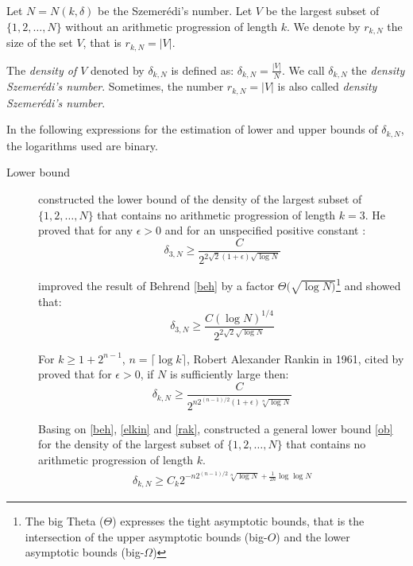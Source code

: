 \begin{defn} Let $N=N(k, \delta)$ be the Szemerédi's number. Let $V$ be the largest subset of $\{1,2,\ldots, N \}$ without an arithmetic progression of length $k.$ We denote by $r_{k,N}$ the size of the set $V$, that is  $r_{k,N}= |V|.$

The \textit{density of $V$} denoted by $\delta_{k,N}$ is defined as: $\delta_{k,N}=\frac{|V|}{N}.$ We call  $\delta_{k,N}$ the \textit{density Szemerédi's number}. Sometimes, the number $r_{k,N}= |V|$ is also called \textit{density Szemerédi's number}.

\end{defn}


In the following expressions for the estimation of lower and upper bounds of $\delta_{k,N}$, the logarithms used are binary.
\begin{description}
\item[Lower bound]
\cite{behrend1946sets} constructed the lower bound of the density of the largest subset of $\{1,2, \ldots, N\}$ that contains no arithmetic progression of length $k=3$. He proved that for any $\epsilon >0$ and for an unspecified positive constant :
\begin{equation}
\delta_{3,N} \geq \frac{C}{2^{2\sqrt{2}(1+\epsilon) \sqrt{\log N}}} \label{beh}
\end{equation}

\cite{elkin2010improved} improved the result of Behrend \eqref{beh} by a factor $\Theta (\sqrt{\log N)}$\footnote{The big Theta ($\Theta$) expresses the tight asymptotic  bounds, that is the intersection of  the upper asymptotic bounds (big-$O$) and the lower asymptotic bounds (big-$\Omega$) } and showed that:
\begin{equation}
\delta_{3,N} \geq \frac{C (\log N)^{1/4}}{2^{2\sqrt{2} \sqrt{\log N}}} \label{elkin}
\end{equation}

For $k \geq 1+2^{n-1}$,  $n=\lceil \log k \rceil$, Robert Alexander Rankin in 1961, cited by \cite{o2011sets} proved that for $\epsilon >0$,  if $N$ is sufficiently large then:
\begin{equation}
\delta_{k,N} \geq \frac{C}{2^{n2^{(n-1)/2}(1+\epsilon) \sqrt[n]{\log N}}} \label{rak}
\end{equation}


Basing on \eqref{beh}, \eqref{elkin} and \eqref{rak}, \cite{o2011sets} constructed  a general lower bound \eqref{ob} for the density of the largest subset of $\{1,2, \ldots, N\}$ that contains no arithmetic progression of length $k.$
\begin{align}
\delta_{k,N} \geq C_k 2^{-n2^{(n-1)/2} \sqrt[n]{\log N} +\frac{1}{2n} \log \log N } \label{ob}
\end{align}


\end{description}
